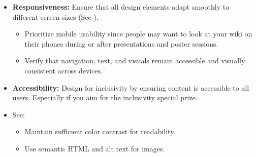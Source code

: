 \begin{itemize}
    \item \textbf{Responsiveness:} Ensure that all design elements adapt smoothly to different screen sizes (See ).
    \begin{itemize}
        \item Prioritize mobile usability since people may want to look at your wiki on their phones during or after presentations and poster sessions.
        \item Verify that navigation, text, and visuals remain accessible and visually consistent across devices.
    \end{itemize}
    \item \textbf{Accessibility:} Design for inclusivity by ensuring content is accessible to all users.
    Especially if you aim for the inclusivity special prize. 
    \item See: 
    \begin{itemize}
        \item Maintain sufficient color contrast for readability.
        \item Use semantic HTML and alt text for images.
    \end{itemize}
\end{itemize}


